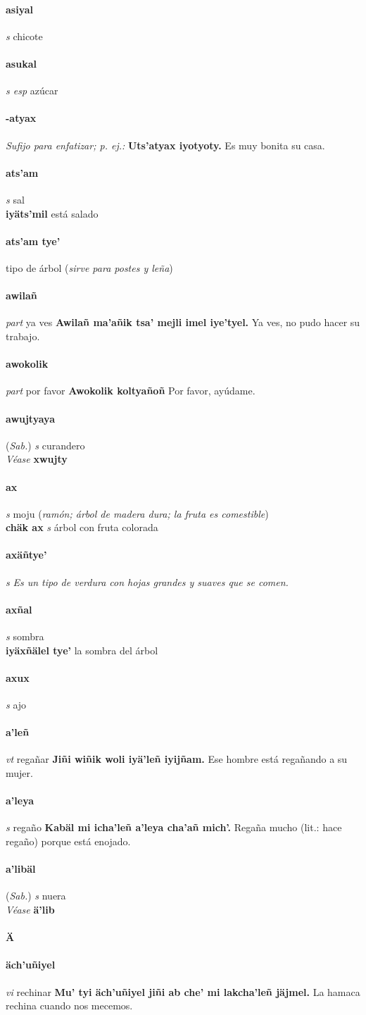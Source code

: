 \documentclass{scrbook}
\newcommand{\entry}[1]{\paragraph{#1}}
\newcommand{\alphaletter}[1]{\addsec{#1}}
\newcommand{\nontranslationdef}[1]{\textit{#1}}
\newcommand{\partofspeech}[1]{\textit{#1}}
\newcommand{\spanishtranslation}[1]{#1}
\newcommand{\clarification}[1]{(\textit{#1})}
\newcommand{\cholexample}[1]{\textbf{#1}}
\newcommand{\exampletranslation}[1]{#1}
\newcommand{\alsosee}[1]{\\\textit{Véase} \textbf{#1}}
\newcommand{\relevantdialect}[1]{(\textit{#1})}
\newcommand{\secondaryentry}[1]{\\\textbf{#1}}
\newcommand{\secondpartofspeech}[1]{\textit{#1}}
\newcommand{\secondtranslation}[1]{#1}
\begin{document}
\begin{multicols}{2}
\entry{asiyal}
\partofspeech{s}
\spanishtranslation{chicote}

\entry{asukal}
\partofspeech{s esp}
\spanishtranslation{azúcar}

\entry{-atyax}
\nontranslationdef{Sufijo para enfatizar; p. ej.:}
\cholexample{Uts'atyax iyotyoty.}
\exampletranslation{Es muy bonita su casa.}

\entry{ats'am}
\partofspeech{s}
\spanishtranslation{sal}
\secondaryentry{iyäts'mil}
\secondtranslation{está salado}

\entry{ats'am tye'}
\spanishtranslation{tipo de árbol}
\clarification{sirve para postes y leña}

\entry{awilañ}
\partofspeech{part}
\spanishtranslation{ya ves}
\cholexample{Awilañ ma'añik tsa' mejli imel iye'tyel.}
\exampletranslation{Ya ves, no pudo hacer su trabajo.}

\entry{awokolik}
\partofspeech{part}
\spanishtranslation{por favor}
\cholexample{Awokolik koltyañoñ}
\exampletranslation{Por favor, ayúdame.}

\entry{awujtyaya}
\relevantdialect{Sab.}
\partofspeech{s}
\spanishtranslation{curandero}
\alsosee{xwujty}

\entry{ax}
\partofspeech{s}
\spanishtranslation{moju}
\clarification{ramón; árbol de madera dura; la fruta es comestible}
\secondaryentry{chäk ax}
\secondpartofspeech{s}
\secondtranslation{árbol con fruta colorada}

\entry{axäñtye'}
\partofspeech{s}
\nontranslationdef{Es un tipo de verdura con hojas grandes y suaves que se comen.}

\entry{axñal}
\partofspeech{s}
\spanishtranslation{sombra}
\secondaryentry{iyäxñälel tye'}
\secondtranslation{la sombra del árbol}

\entry{axux}
\partofspeech{s}
\spanishtranslation{ajo}

\entry{a'leñ}
\partofspeech{vt}
\spanishtranslation{regañar}
\cholexample{Jiñi wiñik woli iyä'leñ iyijñam.}
\exampletranslation{Ese hombre está regañando a su mujer.}

\entry{a'leya}
\partofspeech{s}
\spanishtranslation{regaño}
\cholexample{Kabäl mi icha'leñ a'leya cha'añ mich'.}
\exampletranslation{Regaña mucho (lit.: hace regaño) porque está enojado.}

\entry{a'libäl}
\relevantdialect{Sab.}
\partofspeech{s}
\spanishtranslation{nuera}
\alsosee{ä'lib}

\entry{Ä}
\alphaletter{Ä}

\entry{äch'uñiyel}
\partofspeech{vi}
\spanishtranslation{rechinar}
\cholexample{Mu' tyi äch'uñiyel jiñi ab che' mi lakcha'leñ jäjmel.}
\exampletranslation{La hamaca rechina cuando nos mecemos.}


\end{multicols}
\end{document}

